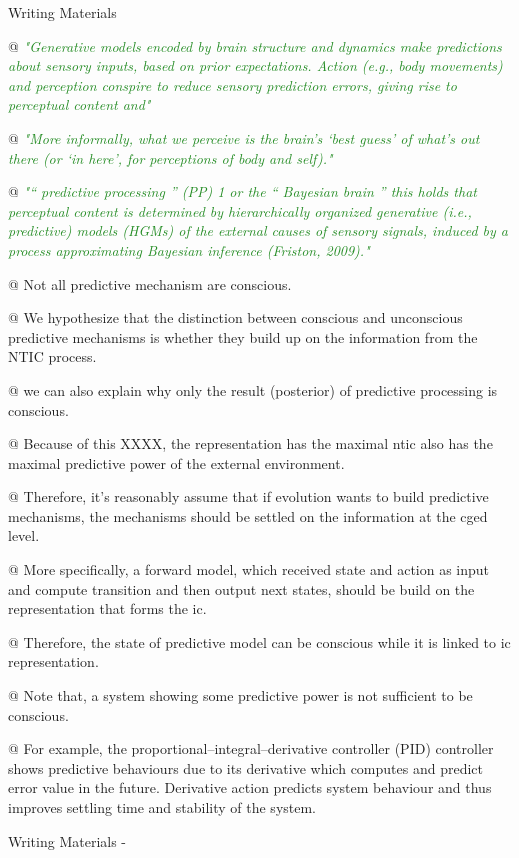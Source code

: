 \documentclass[utf8]{article}
\newenvironment{WritingMaterials} %
    	{
            \begin{tcolorbox}[enhanced,
                title=-,
                size=small,
                colbacktitle=Aquamarine,
                drop fuzzy shadow,
                fontupper=\small,
                boxrule=0.4pt,
                colback=Aquamarine!10!white,
                sharp corners]
                Writing Materials
            \end{tcolorbox}
            \begin{easylist}[itemize]
    	}
    	{
            \end{easylist}  
            \begin{tcolorbox}[enhanced,
                halign=flush right,
                halign title=right,
                size=small,
                colbacktitle=Aquamarine,
                drop fuzzy shadow,
                fontupper=\small,
                boxrule=0.4pt,
                colback=Aquamarine,
                colupper=White,
                sharp corners]
                Writing Materials -
            \end{tcolorbox}        
    	}
\newcommand{\rewrite}[1]{\textcolor{ForestGreen}{\textit{"#1"}}\newline}
\begin{document}
\begin{WritingMaterials}
				@ \rewrite{Generative models encoded by brain structure and dynamics make predictions about sensory inputs, based on prior expectations. Action (e.g., body movements) and perception conspire to reduce sensory prediction errors, giving rise to perceptual content and}

				@ \rewrite{More informally, what we perceive is the brain’s ‘best guess’ of what’s out there (or ‘in here’, for perceptions of body and self).}

				@ \rewrite{“ predictive processing ” (PP) 1 or the “ Bayesian brain ” this holds that perceptual content is determined by hierarchically organized generative (i.e., predictive) models (HGMs) of the external causes of sensory signals, induced by a process approximating Bayesian inference (Friston, 2009).}



				@ Not all predictive mechanism are conscious.


				@ We hypothesize that the distinction between conscious and unconscious predictive mechanisms is whether they build up on the information from the NTIC process.




				@ we can also explain why only the result (posterior) of predictive processing is conscious.


				@ Because of this XXXX, the representation has the maximal \ac{ntic} also has the maximal predictive power of the external environment. 


				@ Therefore, it's reasonably assume that if evolution wants to build predictive mechanisms, the mechanisms should be settled on the information at the \ac{cged} level.

				@ More specifically, a forward model, which received state and action as input and compute transition and then output next states, should be build on the representation that forms the \acl{ic}.

				@ Therefore, the state of predictive model can be conscious while it is linked to \acl{ic} representation.

				@ Note that, a system showing some predictive power is not sufficient to be conscious.

				@ For example, the proportional–integral–derivative controller (PID) controller shows predictive behaviours due to its derivative which computes and predict error value in the future. Derivative action predicts system behaviour and thus improves settling time and stability of the system.


\end{WritingMaterials}
\end{document}
